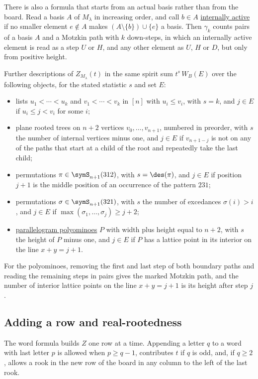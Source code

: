 There is also a formula that starts from an actual basis rather than from the
board.  Read a basis $A$ of $M_\lambda$ in increasing order, and call
$b\in A$ \hyperref[internallyActive]{internally active} if no smaller element
$e\notin A$ makes $(A\setminus\{b\})\cup\{e\}$ a basis.  Then $\gamma_k$ counts pairs of
a basis $A$ and a Motzkin path with $k$ down-steps, in which an internally
active element is read as a step $U$ or $H$, and any other element as $U$, $H$
or $D$, but only from positive height.

Further descriptions of $Z_{M_\lambda}(t)$ in the same spirit sum
$t^{s}\,W_B(E)$ over the following objects, for the stated statistic $s$ and
set $E$:
\begin{itemize}
\item lists $u_1<\dotsb<u_k$ and $v_1<\dotsb<v_k$ in $[n]$ with $u_i\leq v_i$,
  with $s=k$, and $j\in E$ if $u_i\leq j<v_i$ for some $i$;
\item plane rooted trees on $n+2$ vertices $v_0,\dotsc,v_{n+1}$, numbered in
  preorder, with $s$ the number of internal vertices minus one, and $j\in E$
  if $v_{n+1-j}$ is not on any of the paths that start at a child of the root
  and repeatedly take the last child;
\item permutations $\pi\in\symS_{n+1}(312)$, with $s=\des(\pi)$, and $j\in E$
  if position $j+1$ is the middle position of an occurrence of the pattern
  $231$;
\item permutations $\sigma\in\symS_{n+1}(321)$, with $s$ the number of
  excedances $\sigma(i)>i$, and $j\in E$ if
  $\max(\sigma_1,\dotsc,\sigma_j)\geq j+2$;
\item \hyperref[parallelogramPolyomino]{parallelogram polyominoes} $P$ with
  width plus height equal to $n+2$, with $s$ the height of $P$ minus one, and
  $j\in E$ if $P$ has a lattice point in its interior on the line $x+y=j+1$.
\end{itemize}

For the polyominoes, removing the first and last step of both boundary paths
and reading the remaining steps in pairs gives the marked Motzkin path, and
the number of interior lattice points on the line $x+y=j+1$ is its height
after step $j$.


\subsection[schubertMatroidZRowRecursion]{Adding a row and real-rootedness}

The word formula builds $Z$ one row at a time.  Appending a letter $q$ to a
word with last letter $p$ is allowed when $p\geq q-1$, contributes $t$ if $q$
is odd, and, if $q\geq2$, allows a rook in the new row of the board in any
column to the left of the last rook.

